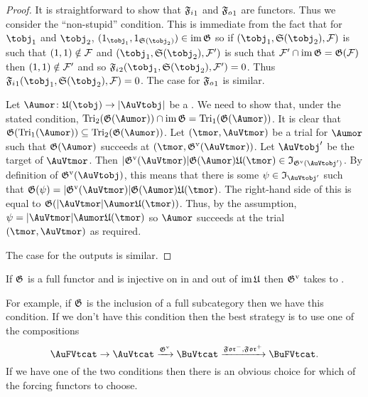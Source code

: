 \documentclass[%
12pt,%
arxiv,%
defaults
]{myclass}
\begin{document}
\begin{proof}
It is straightforward to show that \(\mAo{\iforce}\) and \(\mAo{\oforce}\) are functors.
Thus we consider the ``non\hyp{}stupid'' condition.
This is immediate from the fact that for \tobjs \(\tobj_1\) and \(\tobj_2\), \((1_{\tobj_1}, 1_{\sfunc(\tobj_2)}) \in \im \subfunc\) so if \((\tobj_1, \sfunc(\tobj_2), \m{F})\) is such that \((1,1) \notin \mathcal{F}\) and \((\tobj_1, \sfunc(\tobj_2), \m{F}')\) is such that \(\m{F}' \cap \im \subfunc = \subfunc(\m{F})\) then \((1,1) \notin \mathcal{F}'\) and so \(\mBo{\iforce}(\tobj_1, \sfunc(\tobj_2), \m{F}') = 0\).
Thus \(\mAo{\iforce}(\tobj_1, \sfunc(\tobj_2), \m{F}) = 0\).
The case for \(\mAo{\oforce}\) is similar.

Let \(\Aumor \colon \ufunc(\tobj) \to \forfunc[\AuVtobj]\) be a \Aumor.
We need to show that, under the stated condition, \(\trials[_2]{\subfunc(\Aumor)} \cap \im \subfunc = \trials[_1]{\subfunc(\Aumor)}\).
It is clear that \(\subfunc(\trials[_1]{\Aumor}) \subseteq \trials[_2]{\subfunc(\Aumor)}\).
Let \((\tmor, \AuVtmor)\) be a trial for \(\Aumor\) such that \(\subfunc(\Aumor)\) succeeds at \((\tmor, \mVo{\subfunc}(\AuVtmor))\).
Let \(\AuVtobj'\) be the target of \(\AuVtmor\).
Then \(\sabs{\mVo{\subfunc}(\AuVtmor)} \subfunc(\Aumor) \ufunc(\tmor) \in \itest_{\mVo{\subfunc}(\AuVtobj')}\).
By definition of \(\mVo{\subfunc}(\AuVtobj)\), this means that there is some \(\ifn \in \itest_{\AuVtobj'}\) such that \(\subfunc(\ifn) = \sabs{\mVo{\subfunc}(\AuVtmor)} \subfunc(\Aumor) \ufunc(\tmor)\).
The right\hyp{}hand side of this is equal to \(\subfunc(\sabs{\AuVtmor} \Aumor \ufunc(\tmor))\).
Thus, by the assumption, \(\ifn = \sabs{\AuVtmor} \Aumor \ufunc(\tmor)\) so \(\Aumor\) succeeds at the trial \((\tmor, \AuVtmor)\) as required.

The case for the outputs is similar.
\end{proof}

\begin{corollary}
If \(\subfunc\) is a full functor and is injective on \Aumors in and out of \(\im \ufunc\) then \(\mVo{\subfunc}\) takes \AuFVtobjs to \BuFVtobjs. \noproof
\end{corollary}

For example, if \(\subfunc\) is the inclusion of a full subcategory then we have this condition.
If we don't have this condition then the best strategy is to use one of the compositions
%
\[
  \AuFVtcat \to \AuVtcat \xrightarrow{\mVo{\subfunc}} \BuVtcat \xrightarrow{\Jforfunc, \Mforfunc} \BuFVtcat.
\] 
%
If we have one of the two conditions then there is an obvious choice for which of the forcing functors to choose.
\end{document}

